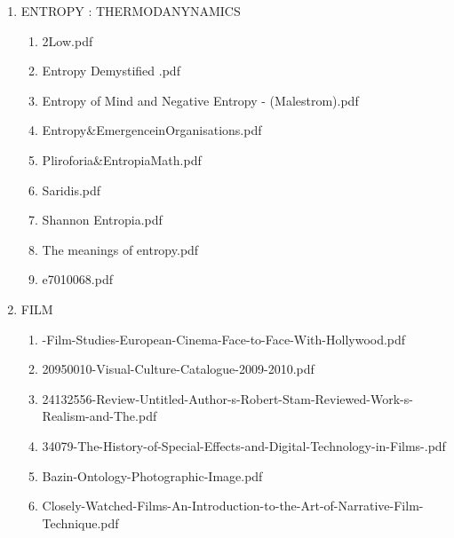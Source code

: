 \documentclass[11pt]{article}
\begin{document}
\begin{enumerate}
\begin{enumerate}
\begin{enumerate}
\begin{enumerate}
\item ENTROPY : THERMODANYNAMICS
\label{sec-1-1-1-1-7-3-25}
\begin{enumerate}
\item 2Low.pdf
\label{sec-1-1-1-1-7-3-25-1}

\item Entropy  Demystified .pdf
\label{sec-1-1-1-1-7-3-25-2}

\item Entropy of Mind and Negative Entropy - (Malestrom).pdf
\label{sec-1-1-1-1-7-3-25-3}

\item Entropy\&EmergenceinOrganisations.pdf
\label{sec-1-1-1-1-7-3-25-4}

\item Pliroforia\&EntropiaMath.pdf
\label{sec-1-1-1-1-7-3-25-5}

\item Saridis.pdf
\label{sec-1-1-1-1-7-3-25-6}

\item Shannon Entropia.pdf
\label{sec-1-1-1-1-7-3-25-7}

\item The meanings of entropy.pdf
\label{sec-1-1-1-1-7-3-25-8}

\item e7010068.pdf
\label{sec-1-1-1-1-7-3-25-9}
\end{enumerate}

\item FILM
\label{sec-1-1-1-1-7-3-26}
\begin{enumerate}
\item -Film-Studies-European-Cinema-Face-to-Face-With-Hollywood.pdf
\label{sec-1-1-1-1-7-3-26-1}

\item 20950010-Visual-Culture-Catalogue-2009-2010.pdf
\label{sec-1-1-1-1-7-3-26-2}

\item 24132556-Review-Untitled-Author-s-Robert-Stam-Reviewed-Work-s-Realism-and-The.pdf
\label{sec-1-1-1-1-7-3-26-3}

\item 34079-The-History-of-Special-Effects-and-Digital-Technology-in-Films-.pdf
\label{sec-1-1-1-1-7-3-26-4}

\item Bazin-Ontology-Photographic-Image.pdf
\label{sec-1-1-1-1-7-3-26-5}

\item Closely-Watched-Films-An-Introduction-to-the-Art-of-Narrative-Film-Technique.pdf
\label{sec-1-1-1-1-7-3-26-6}


\end{enumerate}
\end{enumerate}
\end{enumerate}
\end{enumerate}
\end{enumerate}
\end{document}
